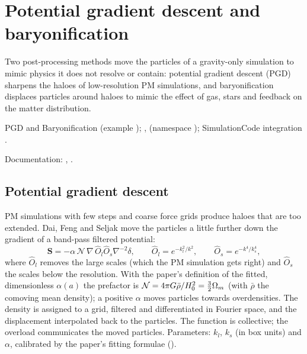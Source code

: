 \chapter{Potential gradient descent and baryonification}\label{ch:pgd-baryonification}

Two post-processing methods move the particles of a gravity-only simulation to mimic physics it does not resolve or
contain: potential gradient descent (PGD) sharpens the haloes of low-resolution PM simulations, and baryonification
displaces particles around haloes to mimic the effect of gas, stars and feedback on the matter distribution.

\begin{modulebox}{PGD and Baryonification}
 (example ); ,
 (namespace ); SimulationCode integration
.\par
Documentation: , .
\end{modulebox}

\section{Potential gradient descent}\label{sec:pgd}

PM simulations with few steps and coarse force grids produce haloes that are too extended. Dai, Feng and Seljak
\cite{Dai2018PGD} move the particles a little further down the gradient of a band-pass filtered potential:
\begin{equation}
\bm S=-\alpha\,\mathcal N\,\nabla\,\hat O_l\hat O_s\nabla^{-2}\delta,\qquad
\hat O_l=e^{-k_l^2/k^2},\qquad \hat O_s=e^{-k^4/k_s^4},
\end{equation}
where $\hat O_l$ removes the large scales (which the PM simulation gets right) and $\hat O_s$ the scales below the
resolution. With the paper's definition of the fitted, dimensionless $\alpha(a)$ the prefactor is
$\mathcal N=4\pi G\bar\rho/H_0^2=\frac32\Omega_m$ (with $\bar\rho$ the comoving mean density); a positive $\alpha$ moves
particles towards overdensities. The density is assigned to a grid, filtered and differentiated in Fourier space, and
the displacement interpolated back to the particles. The function is collective; the  overload
communicates the moved particles. Parameters: $k_l$, $k_s$ (in box units) and $\alpha$, calibrated by the paper's
fitting formulae ().

